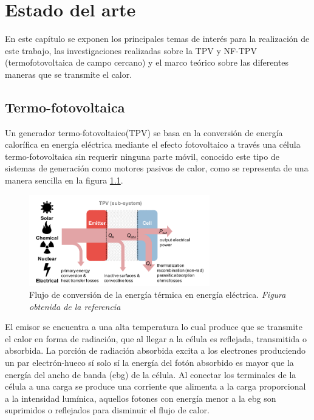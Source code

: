 \chapter{Estado del arte}
En este capítulo se exponen los principales temas de interés para la realización de este trabajo, las investigaciones realizadas sobre la TPV y NF-TPV (termofotovoltaica de campo cercano) y el marco teórico sobre las diferentes maneras que se transmite el calor.

\section{Termo-fotovoltaica}
Un generador termo-fotovoltaico(TPV) se basa en la conversión de energía calorífica en energía eléctrica mediante el efecto fotovoltaico a través una célula termo-fotovoltaica sin requerir ninguna parte móvil, conocido este tipo de sistemas de generación como motores pasivos de calor, como se representa de una manera sencilla en la figura \ref{fig:TPV_Subsistema}.
\begin{figure}[H]
	\centering
	\includegraphics[width=0.7\textwidth]{figuras/TPV_Subsistema.png}
	\caption[Flujo de conversión de la energía térmica en energía eléctrica]{Flujo de conversión de la energía térmica en energía eléctrica. \textit{Figura obtenida de la referencia \cite{Present_Efficiencies_and_Future_Opportunities_in_Thermophotovoltaics}} }
	\label{fig:TPV_Subsistema}
	
\end{figure}
El emisor se encuentra a una alta temperatura lo cual produce que se transmite el calor en forma de radiación, que al llegar a la célula es reflejada, transmitida o absorbida. La porción de radiación absorbida excita a los electrones produciendo un par electrón-hueco sí solo sí la energía del fotón absorbido es mayor que la energía del ancho de banda (\acrshort{ebg}) de la célula. Al conectar los terminales de la célula a una carga se produce una corriente que alimenta a la carga proporcional a la intensidad lumínica, aquellos fotones con energía menor a la \acrshort{ebg} son suprimidos o reflejados para disminuir el flujo de calor\cite{Present_Efficiencies_and_Future_Opportunities_in_Thermophotovoltaics}.\\\\
